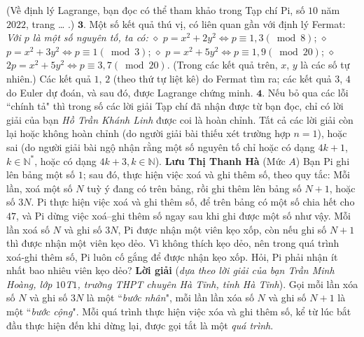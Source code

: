 \begin{multicols}{2}
	\vskip 0.05cm
	(Về định lý Lagrange, bạn đọc có thể tham khảo trong Tạp chí Pi, số $10$ năm $2022$, trang … .)
	\vskip 0.05cm
	$\pmb{3.}$ Một số kết quả thú vị, có liên quan gần với định lý Fermat:
	\vskip 0.05cm
	\textit{Với $p$ là một số nguyên tố, ta có:}
	\vskip 0.05cm
	$\diamond$ $p = {x^2} + 2{y^2} \Leftrightarrow p \equiv 1,3\left( {\bmod 8} \right)$;
	\vskip 0.05cm
	$\diamond$ $p = {x^2} + 3{y^2} \Leftrightarrow p \equiv 1\left( {\bmod 3} \right)$;
	\vskip 0.05cm
	$\diamond$ $p = {x^2} + 5{y^2} \Leftrightarrow p \equiv 1,9\left( {\bmod 20} \right)$;
	\vskip 0.05cm
	$\diamond$ $2p = {x^2} + 5{y^2} \Leftrightarrow p \equiv 3,7\left( {\bmod 20} \right)$.
	\vskip 0.05cm
	(Trong các kết quả trên, $x$, $y$ là các số tự nhiên.)
	\vskip 0.05cm
	Các kết quả $1$, $2$ (theo thứ tự liệt kê) do Fermat tìm ra; các kết quả $3$, $4$ do Euler dự đoán, và sau đó, được Lagrange chứng minh.
	\vskip 0.05cm
	$\pmb{4.}$ Nếu bỏ qua các lỗi ``chính tả" thì trong số các lời giải Tạp chí đã nhận được từ bạn đọc, chỉ có lời giải của bạn \textit{Hồ Trần Khánh Linh} được coi là hoàn chỉnh. Tất cả các lời giải còn lại hoặc không hoàn chỉnh (do người giải bài thiếu xét trường hợp $n = 1$), hoặc sai (do người giải bài ngộ nhận rằng một số nguyên tố chỉ hoặc có dạng $4k + 1$, $k \in \mathbb{N^*}$, hoặc có dạng $4k + 3, k\in \mathbb{N}$).
	\vskip 0.05cm
	\hfill \textbf{\color{thachthuctoanhoc}Lưu Thị Thanh Hà}
	\vskip 0.05cm
	{}
	(Mức $A$) Bạn Pi ghi lên bảng một số $1$; sau đó, thực hiện việc xoá và ghi thêm số, theo quy tắc:  Mỗi lần, xoá một số $N$ tuỳ ý đang có trên bảng, rồi ghi thêm lên bảng số $N+1$,  hoặc số $3N$.
	\vskip 0.05cm
	Pi thực hiện việc xoá và ghi thêm số, để trên bảng có một số chia hết cho $47$, và Pi dừng việc xoá--ghi thêm số ngay sau khi ghi được một số như vậy. 
	\vskip 0.05cm
	Mỗi lần xoá số $N$ và ghi số $3N$, Pi được nhận một viên kẹo xốp, còn nếu ghi số $N+1$ thì được nhận một viên kẹo dẻo. Vì không thích kẹo dẻo, nên trong quá trình xoá-ghi thêm số, Pi luôn cố gắng để được nhận kẹo xốp. Hỏi, Pi phải nhận ít nhất bao nhiêu viên kẹo dẻo? 
	\vskip 0.05cm
	\textbf{\color{thachthuctoanhoc}Lời giải} (\textit{dựa theo lời giải của bạn Trần Minh Hoàng, lớp $10$T$1$, trường THPT chuyên Hà Tĩnh, tỉnh Hà Tĩnh}).
	\vskip 0.05cm
	Gọi mỗi lần xóa số $N$ và ghi số $3N$ là một ``\textit{bước nhân}", mỗi lần lần xóa số $N$ và ghi số $N + 1$ là một ``\textit{bước cộng}".
	\vskip 0.05cm
	Mỗi quá trình thực hiện việc xóa và ghi thêm số, kể từ lúc bắt đầu thực hiện đến khi dừng lại, được gọi tắt là một \textit{quá trình}.

\end{multicols}
